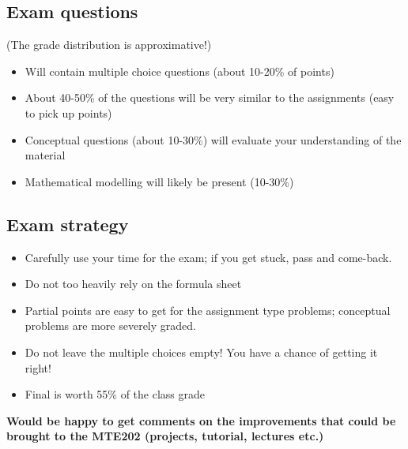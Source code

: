 \subsection*{Exam questions}
(The grade distribution is approximative!)
\begin{itemize}
\item Will contain multiple choice questions (about 10-20\% of points)
\item About 40-50\% of the questions will be very similar to the assignments (easy to pick up points)
\item Conceptual questions (about 10-30\%) will evaluate your understanding of the material
\item Mathematical modelling will likely be present (10-30\%)
\end{itemize}


\subsection*{Exam strategy}
\begin{itemize}
\item Carefully use your time for the exam; if you get stuck, pass and come-back.
\item Do not too heavily rely on the formula sheet
\item Partial points are easy to get for the assignment type problems; conceptual problems are more severely graded.
\item  Do not leave the multiple choices empty! You have a chance of getting it right!
\item Final is worth 55\% of the class grade
\end{itemize}

\textbf{Would be happy to get comments on the improvements that could be brought to the MTE202 (projects, tutorial, lectures etc.)}


